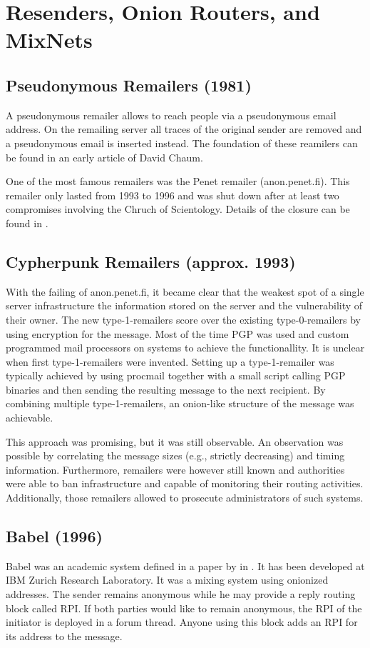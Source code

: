 \section{Resenders, Onion Routers, and MixNets\label{sec:remailersAndMixnets}}
\subsection{Pseudonymous Remailers (1981)\label{sec:remPseudo}}
A pseudonymous remailer allows to reach people via a pseudonymous email address. On the remailing server all traces of the original sender are removed and a pseudonymous email is inserted instead. The foundation of these reamilers can be found in an early article of David Chaum\cite{CHAUM1}.

One of the most famous remailers was the Penet remailer (anon.penet.fi). This remailer only lasted from 1993 to 1996 and was shut down after at least two compromises involving the Chruch of Scientology. Details of the closure can be found in \cite{penetClosure}.

\subsection{Cypherpunk Remailers (approx. 1993)\label{sec:remCypherpunk}}
With the failing of anon.penet.fi, it became clear that the weakest spot of a single server infrastructure the information stored on the server and the vulnerability of their owner. The new type-1-remailers score over the existing type-0-remailers by using encryption for the message. Most of the time PGP was used and custom programmed mail processors on systems to achieve the functionallity. It is unclear when first type-1-remailers were invented. Setting up a type-1-remailer was typically achieved by using procmail together with a small script calling PGP binaries and then sending the resulting message to the next recipient. By combining multiple type-1-remailers, an onion-like structure of the message was achievable. 

This approach was promising, but it was still observable. An observation was possible by correlating the message sizes (e.g., strictly decreasing) and timing information. Furthermore, remailers were however still known and authorities were able to ban infrastructure and capable of monitoring their routing activities. Additionally, those remailers allowed to prosecute administrators of such systems.

\subsection{Babel (1996)}
Babel was an academic system defined in a paper by \citeauthor{babel} in \citeyear{babel}\cite{babel}. It has been developed at IBM Zurich Research Laboratory. It was a mixing system using onionized addresses. The sender remains anonymous while he may provide a reply routing block called RPI. If both parties would like to remain anonymous, the RPI of the initiator is deployed in a forum thread. Anyone using this block adds an RPI for its address to the message.

